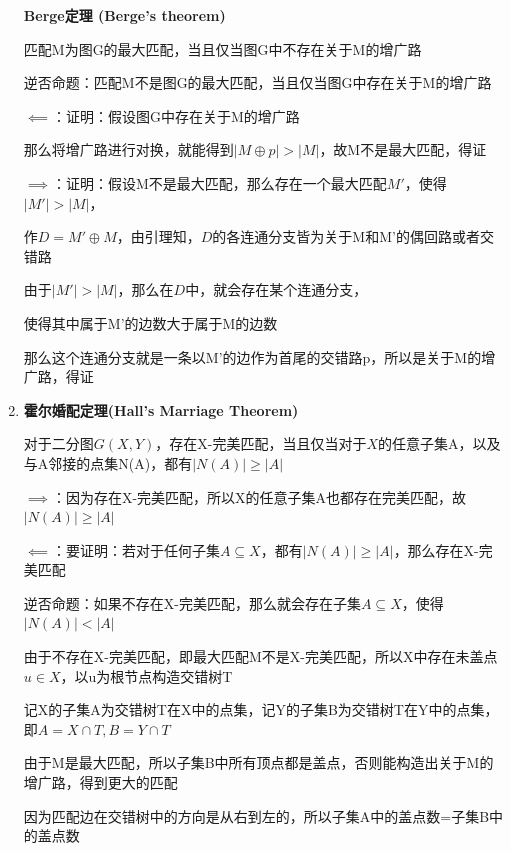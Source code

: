 \documentclass[UTF8]{ctexart}
\begin{document}
\begin{enumerate}
            \textbf{Berge定理 (Berge's theorem)}\cite{berge1957two}

            匹配M为图G的最大匹配，当且仅当图G中不存在关于M的增广路

            逆否命题：匹配M不是图G的最大匹配，当且仅当图G中存在关于M的增广路

            $\impliedby$：证明：假设图G中存在关于M的增广路

            那么将增广路进行对换，就能得到$|M\oplus p|>|M|$，故M不是最大匹配，得证

            $\implies$：证明：假设M不是最大匹配，那么存在一个最大匹配$M'$，使得$|M'|>|M|$，

            作$D=M'\oplus M$，由引理知，$D$的各连通分支皆为关于M和M'的偶回路或者交错路

            由于$|M'|>|M|$，那么在$D$中，就会存在某个连通分支，

            使得其中属于M'的边数大于属于M的边数

            那么这个连通分支就是一条以M'的边作为首尾的交错路p，所以是关于M的增广路，得证

            \vspace{1cm}

      \item


            \textbf{霍尔婚配定理(Hall's Marriage Theorem)}\cite{hall1987representatives}

            对于二分图$G(X,Y)$，存在X-完美匹配，当且仅当对于$X$的任意子集A，以及与A邻接的点集N(A)，都有$|N(A)|\ge|A|$

            $\implies$：因为存在X-完美匹配，所以X的任意子集A也都存在完美匹配，故$|N(A)|\ge|A|$

            $\impliedby$：要证明：若对于任何子集$A\subseteq X$，都有$|N(A)|\ge|A|$，那么存在X-完美匹配

            逆否命题：如果不存在X-完美匹配，那么就会存在子集$A\subseteq X$，使得$|N(A)|<|A|$


            由于不存在X-完美匹配，即最大匹配M不是X-完美匹配，所以X中存在未盖点$u\in X$，以u为根节点构造交错树T

            记X的子集A为交错树T在X中的点集，记Y的子集B为交错树T在Y中的点集，即$A=X\cap T,B=Y\cap T$

            由于M是最大匹配，所以子集B中所有顶点都是盖点，否则能构造出关于M的增广路，得到更大的匹配

            因为匹配边在交错树中的方向是从右到左的，所以子集A中的盖点数=子集B中的盖点数


\end{enumerate}
\end{document}
